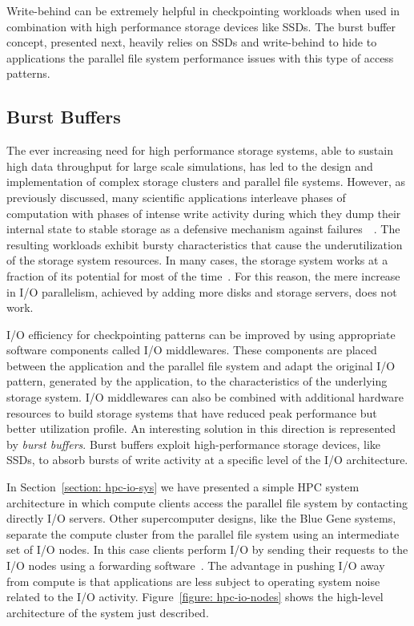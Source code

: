 Write-behind can be extremely helpful in checkpointing workloads when used in combination with high performance storage devices like SSDs. The burst buffer concept, presented next, heavily relies on SSDs and write-behind
to hide to applications the parallel file system performance issues with this type of access patterns.

\subsection{Burst Buffers}
The ever increasing need for high performance storage systems, able to sustain high data throughput for large scale simulations, has led to the design and implementation of complex storage clusters and parallel file systems. 
However, as previously discussed, many scientific applications interleave phases of computation with phases of intense write activity during which they dump their internal state to stable storage as a defensive mechanism
against failures~\cite{Wang2004}~\cite{Kim2010}. The resulting workloads exhibit bursty characteristics that cause the underutilization of the storage system resources. In many cases, the storage system works at a fraction of 
its potential for most of the time~\cite{CarnsHABLLR11}. For this reason, the mere increase in I/O parallelism, achieved by adding more disks and storage servers, does not work.

I/O efficiency for checkpointing patterns can be improved by using appropriate software components called I/O middlewares. These components are placed between the application and the parallel file system and adapt the
original I/O pattern, generated by the application, to the characteristics of the underlying storage system. I/O middlewares can also be combined with additional hardware resources to build storage systems that have
reduced peak performance but better utilization profile. An interesting solution in this direction is represented by \textit{burst buffers}. Burst buffers exploit high-performance storage devices, like SSDs, to absorb
bursts of write activity at a specific level of the I/O architecture.

In Section~\ref{section: hpc-io-sys} we have presented a simple HPC system architecture in which compute clients access the parallel file system by contacting directly I/O servers. Other supercomputer designs, like the Blue 
Gene systems, separate the compute cluster from the parallel file system using an intermediate set of I/O nodes. In this case clients perform I/O by sending their requests to the I/O nodes using a forwarding software~\cite{Iskra2008}. 
The advantage in pushing I/O away from compute is that applications are less subject to operating system noise related to the I/O activity. Figure~\ref{figure: hpc-io-nodes} shows the high-level architecture of the system just 
described.

